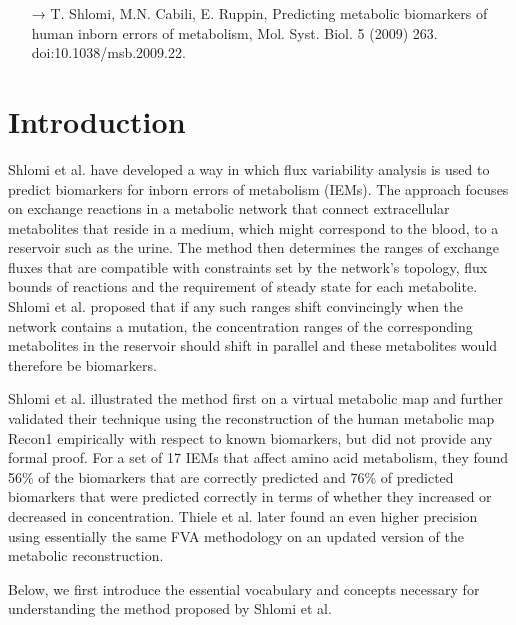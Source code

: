 \documentclass[10pt,a4paper,onecolumn]{article}
\begin{document}
\begin{rebox}
\small
\begin{flushleft}
\begin{itemize}
    \item[→] T. Shlomi, M.N. Cabili, E. Ruppin, Predicting metabolic biomarkers of
human inborn errors of metabolism, Mol. Syst. Biol. 5 (2009) 263.
doi:10.1038/msb.2009.22.
  \end{itemize}\par
\end{flushleft}
\end{rebox}


\section{Introduction}\label{introduction}

Shlomi et al. \autocite{Shlomi2009} have developed a way in which flux
variability analysis \autocite{Mahadevan2003} is used to predict
biomarkers for inborn errors of metabolism (IEMs). The approach focuses
on exchange reactions in a metabolic network that connect extracellular
metabolites that reside in a medium, which might correspond to the
blood, to a reservoir such as the urine. The method then determines the
ranges of exchange fluxes that are compatible with constraints set by
the network's topology, flux bounds of reactions and the requirement of
steady state for each metabolite. Shlomi et al. proposed that if any
such ranges shift convincingly when the network contains a mutation, the
concentration ranges of the corresponding metabolites in the reservoir
should shift in parallel and these metabolites would therefore be
biomarkers.

Shlomi et al. illustrated the method first on a virtual metabolic map
and further validated their technique using the reconstruction of the
human metabolic map Recon1 \autocite{Duarte2007} empirically with
respect to known biomarkers, but did not provide any formal proof. For a
set of 17 IEMs that affect amino acid metabolism, they found 56\% of the
biomarkers that are correctly predicted and 76\% of predicted biomarkers
that were predicted correctly in terms of whether they increased or
decreased in concentration. Thiele et al. \autocite{Thiele2013} later
found an even higher precision using essentially the same FVA
methodology on an updated version of the metabolic reconstruction.

Below, we first introduce the essential vocabulary and concepts
necessary for understanding the method proposed by Shlomi et al.
\end{document}
